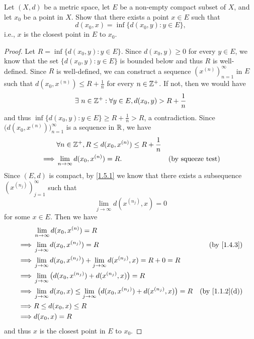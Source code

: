 \begin{ex}\label{ex:1.5.14}
  Let \((X, d)\) be a metric space, let \(E\) be a non-empty compact subset of \(X\), and let \(x_0\) be a point in \(X\).
  Show that there exists a point \(x \in E\) such that
  \[
    d(x_0, x) = \inf\{d(x_0, y) : y \in E\},
  \]
  i.e., \(x\) is the closest point in \(E\) to \(x_0\).
\end{ex}

\begin{proof}
  Let \(R = \inf\{d(x_0, y) : y \in E\}\).
  Since \(d(x_0, y) \geq 0\) for every \(y \in E\), we know that the set \(\{d(x_0, y) : y \in E\}\) is bounded below and thus \(R\) is well-defined.
  Since \(R\) is well-defined, we can construct a sequence \((x^{(n)})_{n = 1}^\infty\) in \(E\) such that \(d(x_0, x^{(n)}) \leq R + \frac{1}{n}\) for every \(n \in \mathbb{Z}^+\).
  If not, then we would have
  \[
    \exists\ n \in \mathbb{Z}^+ : \forall y \in E, d(x_0, y) > R + \frac{1}{n}
  \]
  and thus \(\inf\{d(x_0, y) : y \in E\} \geq R + \frac{1}{n} > R\), a contradiction.
  Since \(\big(d(x_0, x^{(n)})\big)_{n = 1}^\infty\) is a sequence in \(\mathbb{R}\), we have
  \begin{align*}
             & \forall n \in \mathbb{Z}^+, R \leq d(x_0, x^{(n)}) \leq R + \frac{1}{n}                            \\
    \implies & \lim_{n \to \infty} d(x_0, x^{(n)}) = R.                        & \text{(by squeeze test)}
  \end{align*}
  Since \((E, d)\) is compact, by \cref{1.5.1} we know that there exists a subsequence \((x^{(n_j)})_{j = 1}^\infty\) such that
  \[
    \lim_{j \to \infty} d(x^{(n_j)}, x) = 0
  \]
  for some \(x \in E\).
  Then we have
  \begin{align*}
             & \lim_{n \to \infty} d(x_0, x^{(n)}) = R                                                                                                \\
    \implies & \lim_{j \to \infty} d(x_0, x^{(n_j)}) = R                                                                & \text{(by \cref{1.4.3})}    \\
    \implies & \lim_{j \to \infty} d(x_0, x^{(n_j)}) + \lim_{j \to \infty} d(x^{(n_j)}, x) = R + 0 = R                                                \\
    \implies & \lim_{j \to \infty} \big(d(x_0, x^{(n_j)}) + d(x^{(n_j)}, x)\big) = R                                                                  \\
    \implies & \lim_{j \to \infty} d(x_0, x) \leq \lim_{j \to \infty} \big(d(x_0, x^{(n_j)}) + d(x^{(n_j)}, x)\big) = R & \text{(by \cref{1.1.2}(d))} \\
    \implies & R \leq d(x_0, x) \leq R                                                                                                                \\
    \implies & d(x_0, x) = R
  \end{align*}
  and thus \(x\) is the closest point in \(E\) to \(x_0\).
\end{proof}

